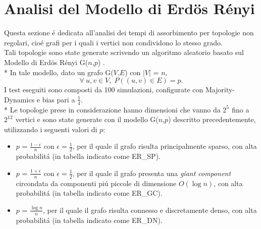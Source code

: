 \documentclass[../Tesi.tex]{subfiles}
\begin{document}
\section{Analisi del Modello di Erd{\"o}s R\'enyi}
Questa sezione \'e dedicata all'analisi dei tempi di assorbimento per topologie non regolari, cio\'e grafi per i quali i vertici non condividono lo stesso grado.\\
Tali topologie sono state generate scrivendo un algoritmo aleatorio basato sul Modello di Erd{\"o}s R\'enyi G($n$,$p$) \cite{Erdos:1959:pmd}.\\*
In tale modello, dato un grafo G($V$,$E$) con $|V|$ = $n$,
\begin{equation}
    \forall \: u,v \in V,\; P((u,v) \in E)=p.
\end{equation}
I test eseguiti sono composti da 100 simulazioni, configurate con Majority-Dynamics e bias pari a $\frac{1}{4}$.\\*
Le topologie prese in considerazione hanno dimensioni che vanno da $2^{5^{\mathrm{}}}$ fino a $2^{12^{\mathrm{}}}$ vertici e sono state generate con il modello G($n$,$p$) descritto precedentemente, utilizzando i seguenti valori di $p$:
\begin{itemize}
\item $p$ = $\frac{1-\epsilon}{n}$ con $\epsilon=\frac{1}{2}$, per il quale il grafo risulta principalmente sparso, con alta probabilit\'a (in tabella indicato come ER\_SP).
\item $p$ = $\frac{1+\epsilon}{n}$ con $\epsilon=\frac{1}{2}$, per il quale il grafo presenta una \emph{giant component} circondata da componenti pi\'u piccole di dimensione $O(\log{}n)$, con alta probabilit\'a (in tabella indicato come ER\_GC).
\item $p$ = $\frac{\log{}n}{n}$, per il quale il grafo risulta connesso e discretamente denso, con alta probabilit\'a (in tabella indicato come ER\_DN).
\end{itemize}
\end{document}
